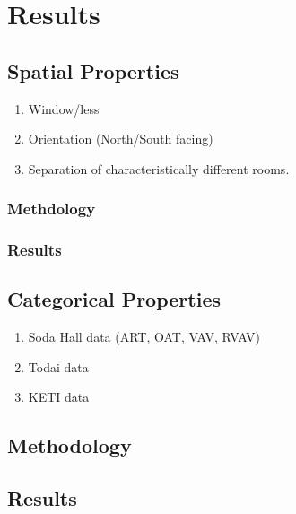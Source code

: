 \section{Results}

\subsection{Spatial Properties}

\begin{enumerate}
\item Window/less
\item Orientation (North/South facing)
\item Separation of characteristically different rooms.
\end{enumerate}

\subsubsection{Methdology}

\subsubsection{Results}

\subsection{Categorical Properties}

\begin{enumerate}
\item Soda Hall data (ART, OAT, VAV, RVAV)
\item Todai data
\item KETI data
\end{enumerate}

\subsection{Methodology}

\subsection{Results}




